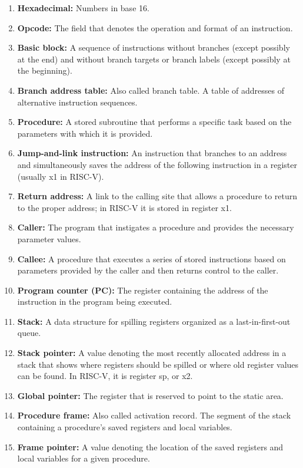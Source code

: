 \documentclass{article}
\begin{document}
\begin{enumerate}
    \item \textbf{Hexadecimal:} Numbers in base 16.
    \item \textbf{Opcode:} The field that denotes the operation and format of an instruction.
    \item \textbf{Basic block:} A sequence of instructions without branches (except possibly at the end) and without branch targets or branch labels (except possibly at the beginning).
    \item \textbf{Branch address table:} Also called branch table. A table of addresses of alternative instruction sequences.
    \item \textbf{Procedure:} A stored subroutine that performs a specific task based on the parameters with which it is provided.
    \item \textbf{Jump-and-link instruction:} An instruction that branches to an address and simultaneously saves the address of the following instruction in a register (usually x1 in RISC-V).
    \item \textbf{Return address:} A link to the calling site that allows a procedure to return to the proper address; in RISC-V it is stored in register x1.
    \item \textbf{Caller:} The program that instigates a procedure and provides the necessary parameter values.
    \item \textbf{Callee:} A procedure that executes a series of stored instructions based on parameters provided by the caller and then returns control to the caller.
    \item \textbf{Program counter (PC):} The register containing the address of the instruction in the program being executed.
    \item \textbf{Stack:} A data structure for spilling registers organized as a last-in-first-out queue.
    \item \textbf{Stack pointer:} A value denoting the most recently allocated address in a stack that shows where registers should be spilled or where old register values can be found. In RISC-V, it is register sp, or x2.
    \item \textbf{Global pointer:} The register that is reserved to point to the static area.
    \item \textbf{Procedure frame:} Also called activation record. The segment of the stack containing a procedure’s saved registers and local variables.
    \item \textbf{Frame pointer:} A value denoting the location of the saved registers and local variables for a given procedure.

\end{enumerate}
\end{document}
